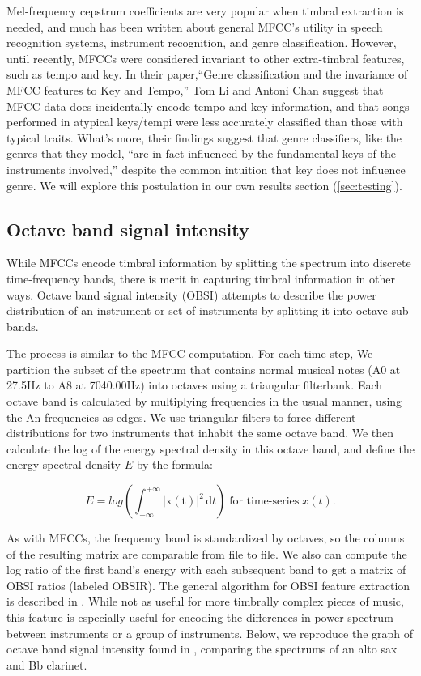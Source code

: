 \documentclass[12pt,twocolumn,titlepage]{article}
\begin{document}
Mel-frequency cepstrum coefficients are very popular when timbral extraction is needed, and much has been written about general MFCC's utility in speech recognition systems, instrument recognition, and genre classification. However, until recently, MFCCs were considered invariant to other extra-timbral features, such as tempo and key. In their paper,``Genre classification and the invariance of MFCC features to Key and Tempo,'' Tom Li and Antoni Chan suggest that MFCC data does incidentally encode tempo and key information, and that songs performed in atypical keys/tempi were less accurately classified than those with typical traits. What's more, their findings suggest that genre classifiers, like the genres that they model, ``are in fact influenced by the fundamental keys of the instruments involved,'' despite the common intuition that key does not influence genre. \cite{LiChan} We will explore this postulation in our own results section (\ref{sec:testing}).

\subsection{Octave band signal intensity}

While MFCCs encode timbral information by splitting the spectrum into discrete time-frequency bands, there is merit in capturing timbral information in other ways. Octave band signal intensity (OBSI) attempts to describe the power distribution of an instrument or set of instruments by splitting it into octave sub-bands. 


The process is similar to the MFCC computation. For each time step, We partition the subset of the spectrum that contains normal musical notes (A0 at 27.5Hz to A8 at 7040.00Hz) into octaves using a triangular filterbank. Each octave band is calculated by multiplying frequencies in the usual manner, using the An frequencies as edges. We use triangular filters to force different distributions for two instruments that inhabit the same octave band. We then calculate the log of the energy spectral density in this octave band, and define the energy spectral density $E$
 by the formula: \cite{Oppenheim}

\begin{equation}\label{}
E = log\left(\int_{-\infty}^{+\infty} \mathrm{|x(t)|}^2\, \mathrm{d}t\right) \; \text{for time-series} \; x(t).
\end{equation}

As with MFCCs, the frequency band is standardized by octaves, so the columns of the resulting matrix are comparable from file to file. We also can compute the log ratio of the first band's energy with each subsequent band to get a matrix of OBSI ratios (labeled OBSIR). The general algorithm for OBSI feature extraction is described in \cite{Essid}. While not as useful for more timbrally complex pieces of music, this feature is especially useful for encoding the differences in power spectrum between instruments or a group of instruments. Below, we reproduce the graph of octave band signal intensity found in \cite{Essid}, comparing the spectrums of an alto sax and Bb clarinet.
\end{document}
